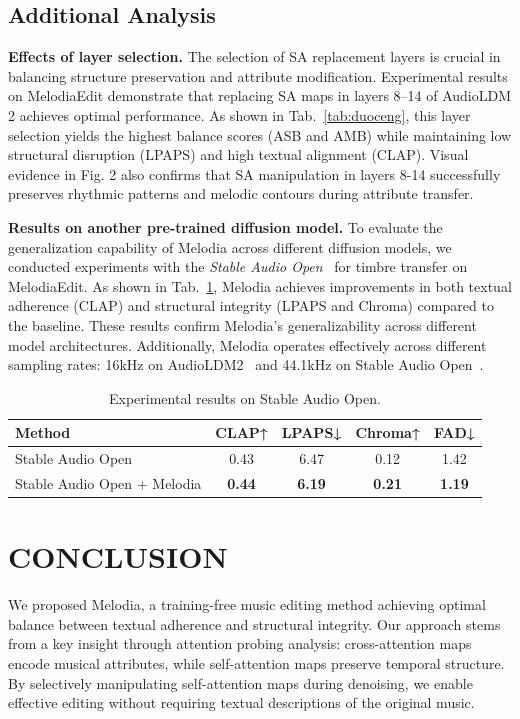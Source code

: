 \subsection{Additional Analysis}
\textbf{Effects of layer    selection.} The selection of SA replacement layers is crucial in balancing structure preservation and attribute modification. Experimental results on MelodiaEdit demonstrate that replacing SA maps in layers 8–14 of AudioLDM 2 achieves optimal performance. As shown in Tab.~\ref{tab:duoceng}, this layer selection yields the highest balance scores (ASB and AMB) while maintaining low structural disruption (LPAPS) and high textual alignment (CLAP). Visual evidence in Fig. 2 also confirms that SA manipulation in layers 8-14 successfully preserves rhythmic patterns and melodic contours during attribute transfer. 

\textbf{Results on another pre-trained diffusion model.} To evaluate the generalization capability of Melodia across different diffusion models, we conducted experiments with the \textit{Stable Audio Open}~\cite{evans2025stableaudioopen} for timbre transfer on MelodiaEdit. As shown in Tab.~\ref{tab:sd_timbre}, Melodia achieves improvements in both textual adherence (CLAP) and structural integrity (LPAPS and Chroma) compared to the baseline. These results confirm Melodia's generalizability across different model architectures. Additionally, Melodia operates effectively across different sampling rates: 16kHz on AudioLDM2~\cite{audioldm2} and 44.1kHz on Stable Audio Open~\cite{evans2025stableaudioopen}.

\begin{table}[t]
\centering
\footnotesize
\setlength{\tabcolsep}{0.1em}
\caption{Experimental results on Stable Audio Open.}
\label{tab:sd_timbre}
\begin{tabular}{l|cccc}
\hline
\textbf{Method}               & \textbf{CLAP↑} & \textbf{LPAPS↓} & \textbf{Chroma↑} & \textbf{FAD↓} \\ 
\hline
Stable Audio Open             & 0.43           & 6.47            & 0.12             & 1.42          \\
Stable Audio Open + Melodia   & \textbf{0.44}  & \textbf{6.19}    & \textbf{0.21}     & \textbf{1.19} \\
\hline
\end{tabular}
\end{table}

\section{CONCLUSION}
We proposed Melodia, a training-free music editing method achieving optimal balance between textual adherence and structural integrity. Our approach stems from a key insight through attention probing analysis: cross-attention maps encode musical attributes, while self-attention maps preserve temporal structure. By selectively manipulating self-attention maps during denoising, we enable effective editing without requiring textual descriptions of the original music.

